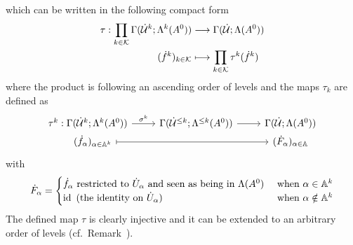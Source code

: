 \begin{prop}
  which can be written in the following compact form
  \begin{align*}
    \tau:\prod_{k\in\mathcal{K}}\Gamma(\dot {\mathcal{U}}^k;\Lambda^k(A^0))
    &\longrightarrow
    \Gamma(\dot{\mathcal{U}};\Lambda(A^0))
  \\(\dot f^k)_{k\in\mathcal{K}}
    &\longmapsto
    \prod_{k\in\mathcal{K}}\tau^k(\dot f^k)
  \end{align*}
  where the product is following an ascending order of levels and the maps
  $\tau_k$ are defined as
  \[ \begin{tikzcd}[row sep=0cm]
    \tau^k:\Gamma(\dot\cU^k;\Lambda^k(A^0))
    \arrow{r}{\sigma^k}&
    \Gamma(\dot\cU^{\leq k};\Lambda^{\leq k}(A^0))
    \rar &
    \Gamma(\dot\cU;\Lambda(A^0))
  \\~~~(\dot f_\alpha)_{\alpha\in\A^k}
    \arrow[|->]{rr}
    &&
    (\dot F_\alpha)_{\alpha\in\A}
  \end{tikzcd} \]
  with
  \[
    \dot F_\alpha=\begin{cases}
      \dot f_\alpha \text{~restricted to } \dot U_\alpha
      \text{~and seen as being in } \Lambda(A^0)
      & \text{~when } \alpha\in\mathbb{A}^k
    \\\operatorname{id} \text{~(the identity on $\dot U_\alpha$) }
      & \text{~when } \alpha\notin\mathbb{A}^k
    \end{cases}
  \]
  The defined map $\tau$ is clearly injective and it can be extended to an
  arbitrary order of levels (cf.\ Remark~\cite[Rem.II.3.5]{Loday1994}).
\end{prop}
